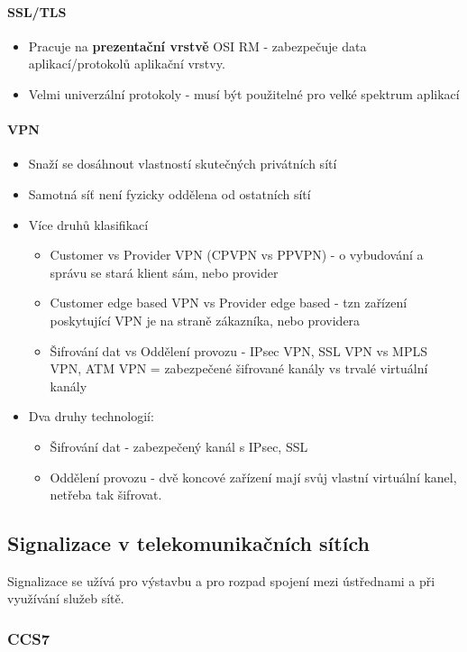 \documentclass[10pt,a4paper]{article}
\begin{document}
\paragraph{SSL/TLS}

\begin{itemize}
\item Pracuje na \textbf{prezentační vrstvě} OSI RM - zabezpečuje data aplikací/protokolů aplikační vrstvy.
\item Velmi univerzální protokoly - musí být použitelné pro velké spektrum aplikací
\end{itemize}
\paragraph{VPN}

\begin{itemize}
\item Snaží se dosáhnout vlastností skutečných privátních sítí
\item Samotná síť není fyzicky oddělena od ostatních sítí
\item Více druhů klasifikací
\begin{itemize}
\item Customer vs Provider VPN (CPVPN vs PPVPN) - o vybudování a správu se stará klient sám, nebo provider
\item Customer edge based VPN vs Provider edge based - tzn zařízení poskytující VPN je na straně zákazníka, nebo providera
\item Šifrování dat vs Oddělení provozu - IPsec VPN, SSL VPN vs MPLS VPN, ATM VPN = zabezpečené šifrované kanály vs trvalé virtuální kanály

\end{itemize}
\item Dva druhy technologií:
\begin{itemize}
\item Šifrování dat - zabezpečený kanál s IPsec, SSL
\item Oddělení provozu - dvě koncové zařízení mají svůj vlastní virtuální kanel, netřeba tak šifrovat.
\end{itemize}
\end{itemize}
\subsection{Signalizace v telekomunikačních sítích}
Signalizace se užívá pro výstavbu a pro rozpad spojení mezi ústřednami a při využívání služeb sítě.
\subsubsection{CCS7}
\end{document}
